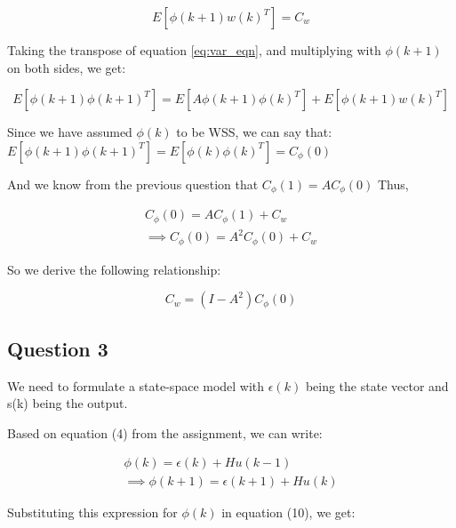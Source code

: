 \documentclass[12pt]{report}
\begin{document}
\begin{equation*}
	E\left[\phi(k+1)w(k)^{T}\right] = C_{w}
\end{equation*}

Taking the transpose of equation \ref{eq:var_eqn}, and multiplying with $\phi(k+1)$ on both sides, we get: 

\begin{equation*}
E\left[\phi(k+1)\phi(k+1)^{T}\right] = E\left[A\phi(k+1)\phi(k)^{T}\right] + E\left[\phi(k+1)w(k)^{T}\right]
\end{equation*} 

Since we have assumed $\phi(k)$ to be WSS, we can say that:\newline
$E\left[\phi(k+1)\phi(k+1)^{T}\right] = E\left[\phi(k)\phi(k)^{T}\right] = C_{\phi}(0)$ 

And we know from the previous question that $C_{\phi}(1) = AC_{\phi}(0)$\newline
Thus,

\begin{equation*}
\begin{aligned}
C_{\phi}(0) = AC_{\phi}(1) + C_{w}\\
\implies C_{\phi}(0) = A^2C_{\phi}(0) + C_{w}
\end{aligned}
\end{equation*}

So we derive the following relationship:

\begin{equation*}
C_{w} = (I-A^2)C_{\phi}(0)
\end{equation*} 

\subsection*{Question 3}

We need to formulate a state-space model with $\epsilon(k)$ being the state vector and s(k) being the output.

Based on equation (4) from the assignment, we can write:

\begin{equation*}
\begin{aligned}
\phi(k) = \epsilon(k) + Hu(k-1)\\
\implies \phi(k+1) = \epsilon(k+1) + Hu(k)
\end{aligned}
\end{equation*} 

Substituting this expression for $\phi(k)$ in equation (10), we get:
\end{document}
